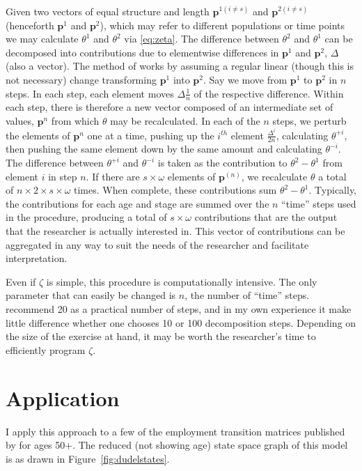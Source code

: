 \documentclass{article}
\begin{document}
Given two vectors of equal structure and length $\textbf{p}^{1(i \ne s)}$ and
$\textbf{p}^{2(i \ne s)}$ (henceforth $\textbf{p}^1$ and $\textbf{p}^2$), which
may refer to different populations or time points we may calculate $\theta^1$ and $\theta^2$ via \eqref{eq:zeta}.
The difference between $\theta^2$ and $\theta^1$ can be decomposed into
contributions due to elementwise differences in $\textbf{p}^1$ and
$\textbf{p}^2$, $\Delta$ (also a vector). The method of \citet{horiuchi2008}
works by assuming a regular linear (though this is not necessary) change transforming $\textbf{p}^{1}$ into
$\textbf{p}^{2}$. Say we move from $\textbf{p}^1$ to $\textbf{p}^2$ in $n$ steps. In each step, each element moves $\Delta \frac{1}{n}$ of the
respective difference. Within each step, there is therefore a new vector
composed of an intermediate set of values, $\textbf{p}^n$ from which $\theta$
may be recalculated. In each of the $n$ steps, we perturb the elements of
$\textbf{p}^n$ one at a time, pushing up the $i^{th}$ element
$\frac{\Delta^i}{2n}$, calculating $\theta^{+i}$, then pushing the same element down by the same amount and
calculating $\theta^{-i}$. The difference between $\theta^{+i}$ and
$\theta^{-i}$ is taken as the contribution to $\theta^2-\theta^1$ from element
$i$ in step $n$. If there are $s\times\omega$ elements of
$\textbf{p}^{(n)}$, we recalculate $\theta$ a total of $n\times2\times
s\times\omega$ times. When complete, these contributions sum
$\theta^2-\theta^1$.
Typically, the contributions for each age and stage are summed over the $n$ ``time'' steps used in the procedure, producing a total of
$s \times \omega$ contributions that are the output that the researcher is
actually interested in. This vector of contributions can be aggregated in any
way to suit the needs of the researcher and facilitate interpretation. 

Even if $\zeta$ is simple, this procedure is computationally
intensive. The only parameter that can easily be changed is $n$, the number of
``time'' steps. \citet{horiuchi2008} recommend 20 as a practical number of
steps, and in my own experience it make little difference whether one chooses 10 or 100
decomposition steps. Depending on the size of the exercise at hand, it may be
worth the researcher's time to efficiently program $\zeta$.

\section{Application}
I apply this approach to a few of the employment transition matrices published
by \citet{Dudel2017} for ages 50+. The reduced (not showing age) state space
graph of this model is as drawn in Figure~\ref{fig:dudelstates}.
\end{document}
